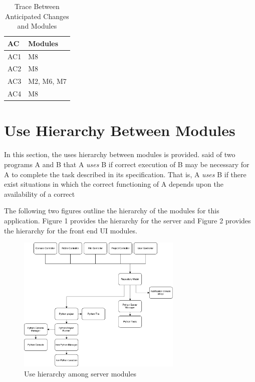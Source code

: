 \documentclass[12pt, titlepage]{article}
\begin{document}
\begin{table}[H]
\centering
\begin{tabular}{p{} p{}}
\toprule
\textbf{AC} & \textbf{Modules}\\
\midrule
    AC1 & M8\\
    AC2 & M8\\
    AC3 & M2, M6, M7\\
    AC4 & M8\\
\bottomrule
\end{tabular}
\caption{Trace Between Anticipated Changes and Modules}
\label{TblACT}
\end{table}

\section{Use Hierarchy Between Modules} \label{SecUse}

In this section, the uses hierarchy between modules is
provided. \citet{Parnas1978} said of two programs A and B that A {\em uses} B if
correct execution of B may be necessary for A to complete the task described in
its specification. That is, A {\em uses} B if there exist situations in which
the correct functioning of A depends upon the availability of a correct

The following two figures outline the hierarchy of the modules for this
application.  Figure 1 provides the hierarchy for the server and Figure 2
provides the hierarchy for the front end UI modules.

\begin{figure}[H]
\centering
\includegraphics[width=0.7\textwidth]{uses-server.pdf}
\caption{Use hierarchy among server modules}
\label{FigUH}
\end{figure}
\end{document}
